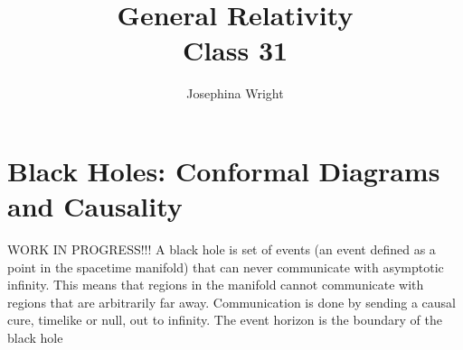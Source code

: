 \documentclass[10pt]{article}
\title{{\Huge General Relativity}\\{\Large{Class 31}}} %
\author{Josephina Wright}
\begin{document}
    \maketitle
    \flushbottom
    \newpage
    \pagestyle{fancynotes}
    \part{Black Holes: Conformal Diagrams and Causality}
WORK IN PROGRESS!!!
\newline A black hole is set of events (an event defined as a point in the spacetime manifold) that can never communicate with asymptotic infinity. This means that regions in the manifold cannot communicate with regions that are arbitrarily far away. Communication is done by sending a causal cure, timelike or null, out to infinity. 
	The event horizon is the boundary of the black hole
\end{document}
